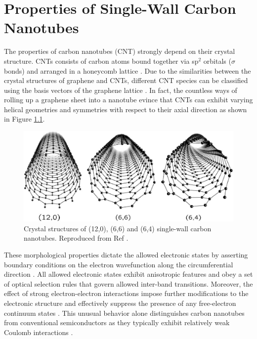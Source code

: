 \chapter{Properties of Single-Wall Carbon Nanotubes}

The properties of carbon nanotubes (CNT) strongly depend on their crystal structure. CNTs consists of carbon atoms bound together via sp$^2$ orbitals ($\sigma$ bonds) and arranged in a honeycomb lattice \cite{soavi2016ultrafast}. Due to the similarities between the crystal structures of graphene and CNTs, different CNT species can be classified using the basis vectors of the graphene lattice \cite{charlier2007electronic}. In fact, the countless ways of rolling up a graphene sheet into a nanotube evince that CNTs can exhibit varying helical geometries and symmetries with respect to their axial direction as shown in Figure \ref{fig:symmetries}. 

\begin{figure}[h]
	\centering
	\includegraphics[scale=0.4]{images/chapter_optical_props/nanotube_symmetries_charlier}
	\caption{Crystal structures of (12,0), (6,6) and (6,4) single-wall carbon nanotubes. Reproduced from Ref \cite{charlier2007electronic}.}
	\label{fig:symmetries}
\end{figure}

These morphological properties dictate the allowed electronic states by asserting boundary conditions on the electron wavefunction along the circumferential direction \cite{charlier2007electronic}. All allowed electronic states exhibit anisotropic features and obey a set of optical selection rules that govern allowed inter-band transitions. Moreover, the effect of strong electron-electron interactions impose further modifications to the electronic structure and effectively suppress the presence of any free-electron continuum states \cite{ando1997excitons}. This unusual behavior alone distinguishes carbon nanotubes from conventional semiconductors as they typically exhibit relatively weak Coulomb interactions \cite{ando1997excitons}.




